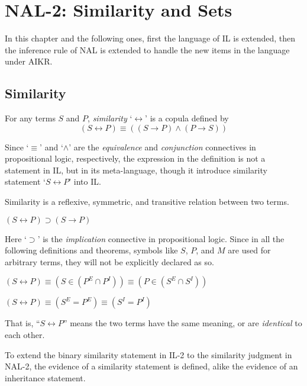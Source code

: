\chapter{NAL-2: Similarity and Sets}

In this chapter and the following ones, first the language of IL is extended, then the inference rule of NAL is extended to handle the new items in the language under AIKR. 

\section{Similarity}

\begin{defi}
For any terms $S$ and $P$, \emph{similarity} `$\leftrightarrow$' is a copula defined by 
\[(S \leftrightarrow P) \equiv ((S \rightarrow P) \wedge (P \rightarrow S))\]
\end{defi}
Since `$\equiv$' and `$\wedge$' are the \emph{equivalence} and \emph{conjunction} connectives in propositional logic, respectively, the expression in the definition is not a statement in IL, but in its meta-language, though it introduce similarity statement `\(S \leftrightarrow P\)' into IL.

\begin{theo}
Similarity is a reflexive, symmetric, and transitive relation between two terms.
\end{theo}

\begin{theo}
\((S \leftrightarrow P) \supset (S \rightarrow P)\)
\end{theo}
Here `$\supset$' is the \emph{implication} connective in propositional logic. Since in all the following definitions and theorems, symbols like $S$, $P$, and $M$ are used for arbitrary terms, they will not be explicitly declared as so.

\begin{theo}
\((S \leftrightarrow P) \equiv (S \in (P^E \cap P^I)) \equiv (P \in (S^E \cap S^I))\)
\end{theo}

\begin{theo}
\((S \leftrightarrow P) \equiv (S^E = P^E) \equiv (S^I = P^I)\)
\end{theo}
That is, ``\(S \leftrightarrow P\)'' means the two terms have the same meaning, or are \emph{identical} to each other.  

To extend the binary similarity statement in IL-2 to the similarity judgment in NAL-2, the evidence of a similarity statement is defined, alike the evidence of an inheritance statement. 

